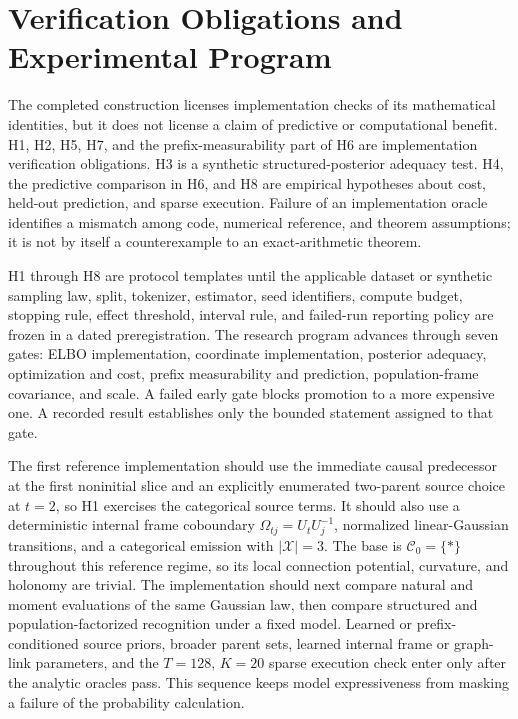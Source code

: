 \chapter[Verification Obligations and Experimental Program]{Verification Obligations and\\Experimental Program}

The completed construction licenses implementation checks of its mathematical identities, but it does not license a claim of predictive or computational benefit. H1, H2, H5, H7, and the prefix-measurability part of H6 are implementation verification obligations. H3 is a synthetic structured-posterior adequacy test. H4, the predictive comparison in H6, and H8 are empirical hypotheses about cost, held-out prediction, and sparse execution. Failure of an implementation oracle identifies a mismatch among code, numerical reference, and theorem assumptions; it is not by itself a counterexample to an exact-arithmetic theorem.

H1 through H8 are protocol templates until the applicable dataset or synthetic sampling law, split, tokenizer, estimator, seed identifiers, compute budget, stopping rule, effect threshold, interval rule, and failed-run reporting policy are frozen in a dated preregistration. The research program advances through seven gates: ELBO implementation, coordinate implementation, posterior adequacy, optimization and cost, prefix measurability and prediction, population-frame covariance, and scale. A failed early gate blocks promotion to a more expensive one. A recorded result establishes only the bounded statement assigned to that gate.

The first reference implementation should use the immediate causal predecessor at the first noninitial slice and an explicitly enumerated two-parent source choice at $t=2$, so H1 exercises the categorical source terms. It should also use a deterministic internal frame coboundary $\Omega_{tj}=U_tU_j^{-1}$, normalized linear-Gaussian transitions, and a categorical emission with $|\mathcal X|=3$. The base is $\mathcal C_0=\{\ast\}$ throughout this reference regime, so its local connection potential, curvature, and holonomy are trivial. The implementation should next compare natural and moment evaluations of the same Gaussian law, then compare structured and population-factorized recognition under a fixed model. Learned or prefix-conditioned source priors, broader parent sets, learned internal frame or graph-link parameters, and the $T=128$, $K=20$ sparse execution check enter only after the analytic oracles pass. This sequence keeps model expressiveness from masking a failure of the probability calculation.

